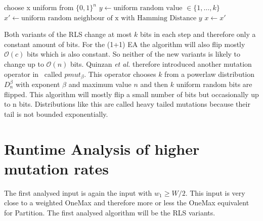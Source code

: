 \begin{algorithm}[bt]
      \caption{\textsc{\RLSR}}\label{alg:rlsR}

      \DontPrintSemicolon %

      \BlankLine
      choose x uniform from ${\{0,1\}}^n$\;
      {
      $y \leftarrow \text{uniform random value }\in \{1,\dots,k\}$\;
      $x' \leftarrow \text{uniform random neighbour of x with Hamming Distance } y$\;
      {
      {
            $x \leftarrow x'$\;
      }
      }
      }
\end{algorithm}

Both variants of the RLS change at most $k$ bits in each step and therefore only a constant amount of bits.
For the (1+1) EA the algorithm will also flip mostly $\mathcal{O}(c)$ bits which is also constant.
So neither of the new variants is likely to change up to $\mathcal{O}(n)$ bits.
Quinzan \textit{et al.} therefore introduced another mutation operator in~\cite{friedrich2018evolutionary} called $pmut_\beta$.
This operator chooses $k$ from a powerlaw distribution $D^\beta_n$ with exponent $\beta$ and maximum value $n$ and then $k$ uniform random bits are flipped.
This algorithm will mostly flip a small number of bits but occasionally up to n bits.
Distributions like this are called heavy tailed mutations because their tail is not bounded exponentially.

\section{Runtime Analysis of higher mutation rates}

The first analysed input is again the input with $w_1\ge W/2$.
This input is very close to a weighted OneMax and therefore more or less the OneMax equivalent for Partition.
The first analysed algorithm will be the RLS variants.

